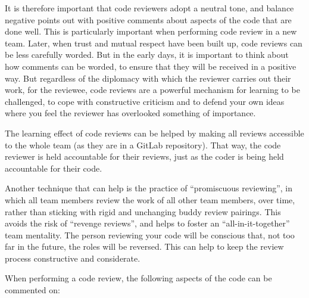 \documentclass[
]{book}
\begin{document}
It is therefore important that code reviewers adopt a neutral tone, and balance negative points out with positive comments about aspects of the code that are done well. This is particularly important when performing code review in a new team. Later, when trust and mutual respect have been built up, code reviews can be less carefully worded. But in the early days, it is important to think about how comments can be worded, to ensure that they will be received in a positive way. But regardless of the diplomacy with which the reviewer carries out their work, for the reviewee, code reviews are a powerful mechanism for learning to be challenged, to cope with constructive criticism and to defend your own ideas where you feel the reviewer has overlooked something of importance.

The learning effect of code reviews can be helped by making all reviews accessible to the whole team (as they are in a GitLab repository). That way, the code reviewer is held accountable for their reviews, just as the coder is being held accountable for their code.

Another technique that can help is the practice of ``promiscuous reviewing'', in which all team members review the work of all other team members, over time, rather than sticking with rigid and unchanging buddy review pairings. This avoids the risk of ``revenge reviews'', and helps to foster an ``all-in-it-together'' team mentality. The person reviewing your code will be conscious that, not too far in the future, the roles will be reversed. This can help to keep the review process constructive and considerate.

When performing a code review, the following aspects of the code can be commented on:
\end{document}

